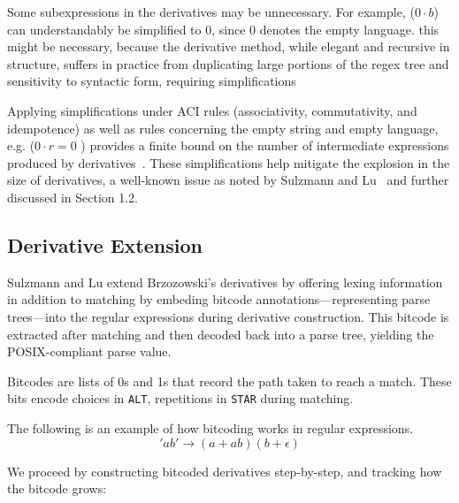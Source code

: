 \documentclass[12pt]{article}
\begin{document}
Some subexpressions in the derivatives may be unnecessary. 
For example, ($0 \cdot b$) can understandably be simplified to \( 0 \), since \( 0 \) denotes the empty language.
this might be necessary, because the derivative method, while elegant and recursive in structure, suffers in practice 
from duplicating large portions of the regex tree and sensitivity to syntactic form, requiring simplifications

Applying simplifications under ACI rules (associativity, commutativity, and idempotence) as well as rules concerning 
the empty string and empty language, e.g. ($0 \cdot r = 0$ ) provides a finite bound on the number of intermediate 
expressions produced by derivatives~\cite{TanAndUrban2023}. These simplifications help mitigate the explosion in the 
size of derivatives, a well-known issue as noted by Sulzmann and Lu~\cite{Sulzmann2014} and further discussed in Section 1.2.

\subsection{Derivative Extension}

Sulzmann and Lu extend Brzozowski’s derivatives by offering lexing information in addition to matching by embeding bitcode 
annotations—representing parse trees—into the regular expressions during derivative construction. This bitcode is extracted 
after matching and then decoded back into a parse tree, yielding the POSIX-compliant parse value.

Bitcodes are lists of 0s and 1s that record the path taken to reach a match. These bits encode choices in \texttt{ALT}, 
repetitions in \texttt{STAR} during matching.

The following is an example of how bitcoding works in regular expressions. \[ 'ab' \rightarrow  (a + ab)(b + \epsilon)\]

We proceed by constructing bitcoded derivatives step-by-step, and tracking how the bitcode grows:
\end{document}

